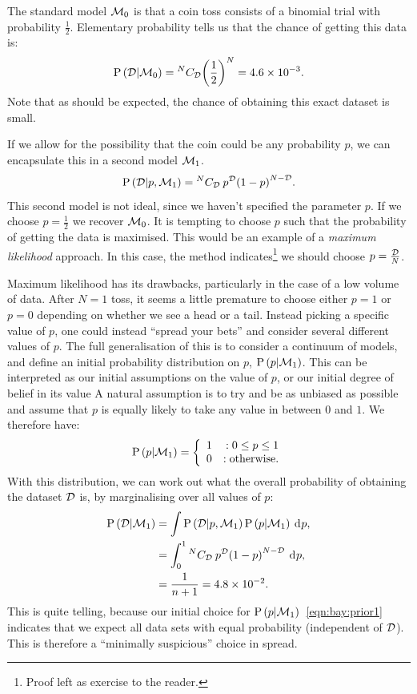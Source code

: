The standard model $\mathcal{M}_0$ is that a coin toss consists of a binomial trial with probability $\frac{1}{2}$. Elementary probability tells us that the chance of getting this data is:
\begin{equation}
  \mathrm{P}\left(\mathcal{D}\middle|\mathcal{M}_0\right)= {^{N}C_{\mathcal{D}}} {\left( \frac{1}{2} \right)}^{N}  = 4.6\times 10^{-3}.
  \label{eqn:bay:M0}
\end{equation}
Note that as should be expected, the chance of obtaining this exact dataset is small. 

If we allow for the possibility that the coin could be any probability $p$, we can encapsulate this in a second model $\mathcal{M}_1$.
\begin{equation}
  \mathrm{P}\left(\mathcal{D}\middle|p,\mathcal{M}_1\right)= {^{N}C_{\mathcal{D}}}\: {p}^{\mathcal{D}} {\left(1 - p \right)}^{N-\mathcal{D}}.
  \label{eqn:bay:M1}
\end{equation}
This second model is not ideal, since we haven't specified the parameter $p$. If we choose $p=\frac{1}{2}$ we recover $\mathcal{M}_0$. It is tempting to choose $p$ such that the probability of getting the data is maximised. This would be an example of a {\em maximum likelihood\/} approach. In this case, the method indicates\footnote{Proof left as exercise to the reader.} we should choose $p = \frac{\mathcal{D}}{N}$. 

Maximum likelihood has its drawbacks, particularly in the case of a low volume of data. After $N=1$ toss, it seems a little premature to choose either $p=1$ or $p=0$ depending on whether we see a head or a tail. Instead picking a specific value of $p$, one could instead ``spread your bets'' and consider several different values of $p$. The full generalisation of this is to consider a continuum of models, and define an initial probability distribution on $p$, $\mathrm{P}\left(p\middle|\mathcal{M}_1\right)$. This can be interpreted as our initial assumptions on the value of $p$, or our initial degree of belief in its value
A natural assumption is to try and be as unbiased as possible and assume that $p$ is equally likely to take any value in between $0$ and $1$. We therefore have:
\begin{equation}
  \mathrm{P}\left(p\middle|\mathcal{M}_1\right)=\left\{
  \begin{array}{lr}
    1 &:0\le p\le1\\
    0 &:\text{otherwise.}\\
  \end{array}
  \right.\label{eqn:bay:prior1}
\end{equation}
With this distribution, we can work out what the overall probability of obtaining the dataset $\mathcal{D}$ is, by marginalising over all values of $p$:
\begin{align}
  \mathrm{P}\left(\mathcal{D}\middle|\mathcal{M}_1\right) 
  &= \int \mathrm{P}\left(\mathcal{D}\middle|p,\mathcal{M}_1\right)\mathrm{P}\left(p\middle|\mathcal{M}_1\right)\: \operatorname{d}^{}\!{p}, \\
  &= \int_0^1 {^{N}C_{\mathcal{D}}}\: {p}^{\mathcal{D}} {\left(1 - p \right)}^{N-\mathcal{D}}\: \operatorname{d}^{}\!{p}, \\
  &= \frac{1}{n+1} = 4.8\times10^{-2}.
  \label{eqn:bay:marg}
\end{align}
This is quite telling, because our initial choice for $\mathrm{P}\left(p\middle|\mathcal{M}_1\right)$~\ref{eqn:bay:prior1} indicates that we expect all data sets with equal probability (independent of $\mathcal{D}$). This is therefore a ``minimally suspicious'' choice in spread.

